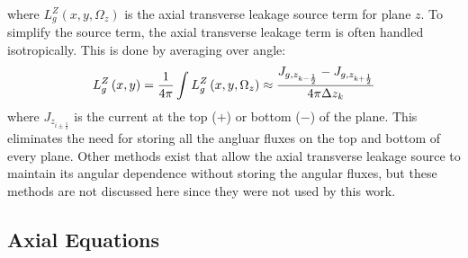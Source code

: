 where $L_{g}^Z\left(x,y,\Omega_z\right)$ is the axial transverse leakage source term for plane $z$.  To simplify the source term, the axial transverse leakage term is often handled isotropically.  This is done by averaging over angle:
\begin{equation}
L_{g}^Z\left(x,y\right) = \frac{1}{4\pi}\intop L_{g}^Z\left(x,y,\Omega_z\right) \approx \frac{J_{g,z_{k-\frac{1}{2}}} - J_{g,z_{k+\frac{1}{2}}}}{4\pi\Delta z_k}
\end{equation}
where $J_{z_{i\pm \frac{1}{2}}}$ is the current at the top ($+$) or bottom ($-$) of the plane.  This eliminates the need for storing all the angluar fluxes on the top and bottom of every plane.  Other methods exist that allow the axial transverse leakage source to maintain its angular dependence without storing the angular fluxes, but these methods are not discussed here since they were not used by this work.

\subsection{Axial Equations}\label{ss:2d1daxialEq}

